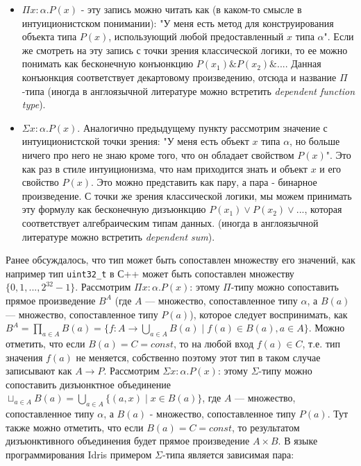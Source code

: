\begin{itemize}
    \item $\Pi x : \alpha . P(x)$ - эту запись можно читать как (в каком-то смысле в интуиционистском понимании): "У меня есть метод для конструирования объекта типа $P(x)$, использующий любой предоставленный $x$ типа $\alpha$". Если же смотреть на эту запись с точки зрения классической логики, то ее можно понимать как бесконечную  конъюнкцию $P(x_1)\&P(x_2)\&...$. Данная конъюнкция соответствует декартовому произведению, отсюда и название $\Pi$-типа (иногда в англоязычной литературе можно встретить \textit{dependent function type}).
    \item $\Sigma x : \alpha . P(x)$. Аналогично предыдущему пункту рассмотрим значение с интуиционистской точки зрения: "У меня есть объект $x$ типа $\alpha$, но больше ничего про него не знаю кроме того, что он обладает свойством $P(x)$". Это как раз в стиле интуиционизма, что нам приходится знать и объект $x$ и его свойство $P(x)$. Это можно представить как пару, а пара - бинарное произведение. С точки же зрения классической логики, мы можем принимать эту формулу как бесконечную дизъюнкцию $P(x_1) \vee P(x_2)\vee ...$, которая соответствует алгебраическим типам данных. (иногда в англоязычной литературе можно встретить \textit{dependent sum}).
\end{itemize}

Ранее обсуждалось, что тип может быть сопоставлен множеству его значений, как например тип \texttt{uint32_t} в С++ может быть сопоставлен множеству $\{0, 1, ..., 2^{32} - 1\}$. Рассмотрим $\Pi x : \alpha . P(x)$: этому $\Pi$-типу можно сопоставить прямое произведение $B^A$ (где $A$ --- множество, сопоставленное типу $\alpha$, а $B(a)$ --- множество, сопоставленное типу $P(a)$), которое следует воспринимать, как $B^A = \prod_{a \in A} B(a) = \{ f : A \rightarrow \bigcup_{a \in A} B(a) \mid f(a) \in B(a), a \in A  \}$. Можно отметить, что если $B(a) = C = const$, то на любой вход $f(a) \in C$, т.е. тип значения $f(a)$ не меняется, собственно поэтому этот тип в таком случае записывают как $A \rightarrow P$. Рассмотрим $\Sigma x : \alpha . P(x)$: этому $\Sigma$-типу можно сопоставить дизъюнктное объединение $\sqcup_{a \in A} B(a) = \bigcup_{a \in A}\{(a, x) \mid x \in B(a)\}$, где $A$ --- множество, сопоставленное типу $\alpha$, а $B(a)$ - множество, сопоставленное типу $P(a)$. Тут также можно отметить, что если $B(a) = C = const$, то результатом дизъюнктивного объединения будет прямое произведение $A \times B$. В языке программирования Idris примером $\Sigma$-типа является зависимая пара:

